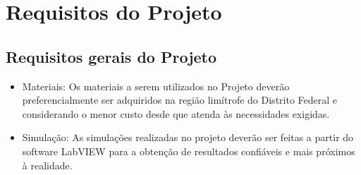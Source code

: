 \chapter{Requisitos do Projeto}

\section{Requisitos gerais do Projeto}

\begin{itemize}
\item Materiais: Os materiais a serem utilizados no Projeto deverão preferencialmente ser adquiridos na região limítrofe do Distrito Federal e considerando o menor custo desde que atenda às necessidades exigidas.
\item Simulação: As simulações realizadas no projeto deverão ser feitas a partir do software LabVIEW para a obtenção de resultados confiáveis e mais próximos à realidade.
\end{itemize}
